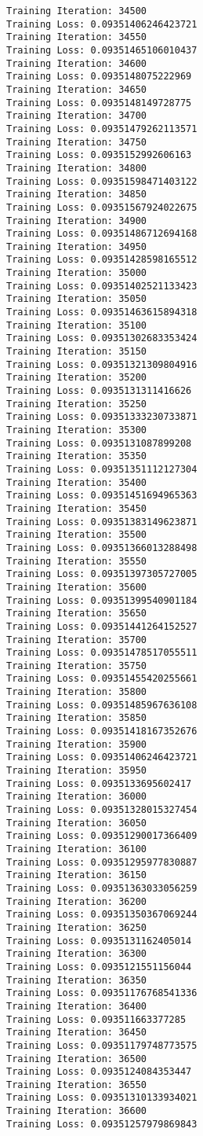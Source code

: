 \documentclass[11pt]{article}
\begin{document}
\begin{Verbatim}[commandchars=\\\{\}]
Training Iteration: 34500
Training Loss: 0.09351406246423721
Training Iteration: 34550
Training Loss: 0.09351465106010437
Training Iteration: 34600
Training Loss: 0.0935148075222969
Training Iteration: 34650
Training Loss: 0.0935148149728775
Training Iteration: 34700
Training Loss: 0.09351479262113571
Training Iteration: 34750
Training Loss: 0.0935152992606163
Training Iteration: 34800
Training Loss: 0.09351598471403122
Training Iteration: 34850
Training Loss: 0.09351567924022675
Training Iteration: 34900
Training Loss: 0.09351486712694168
Training Iteration: 34950
Training Loss: 0.09351428598165512
Training Iteration: 35000
Training Loss: 0.09351402521133423
Training Iteration: 35050
Training Loss: 0.09351463615894318
Training Iteration: 35100
Training Loss: 0.09351302683353424
Training Iteration: 35150
Training Loss: 0.09351321309804916
Training Iteration: 35200
Training Loss: 0.0935131311416626
Training Iteration: 35250
Training Loss: 0.09351333230733871
Training Iteration: 35300
Training Loss: 0.0935131087899208
Training Iteration: 35350
Training Loss: 0.09351351112127304
Training Iteration: 35400
Training Loss: 0.09351451694965363
Training Iteration: 35450
Training Loss: 0.09351383149623871
Training Iteration: 35500
Training Loss: 0.09351366013288498
Training Iteration: 35550
Training Loss: 0.09351397305727005
Training Iteration: 35600
Training Loss: 0.09351399540901184
Training Iteration: 35650
Training Loss: 0.09351441264152527
Training Iteration: 35700
Training Loss: 0.09351478517055511
Training Iteration: 35750
Training Loss: 0.09351455420255661
Training Iteration: 35800
Training Loss: 0.09351485967636108
Training Iteration: 35850
Training Loss: 0.09351418167352676
Training Iteration: 35900
Training Loss: 0.09351406246423721
Training Iteration: 35950
Training Loss: 0.0935133695602417
Training Iteration: 36000
Training Loss: 0.09351328015327454
Training Iteration: 36050
Training Loss: 0.09351290017366409
Training Iteration: 36100
Training Loss: 0.09351295977830887
Training Iteration: 36150
Training Loss: 0.09351363033056259
Training Iteration: 36200
Training Loss: 0.09351350367069244
Training Iteration: 36250
Training Loss: 0.0935131162405014
Training Iteration: 36300
Training Loss: 0.0935121551156044
Training Iteration: 36350
Training Loss: 0.09351176768541336
Training Iteration: 36400
Training Loss: 0.093511663377285
Training Iteration: 36450
Training Loss: 0.09351179748773575
Training Iteration: 36500
Training Loss: 0.0935124084353447
Training Iteration: 36550
Training Loss: 0.09351310133934021
Training Iteration: 36600
Training Loss: 0.09351257979869843

\end{Verbatim}
\end{document}
